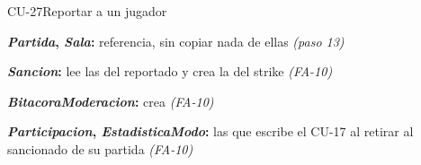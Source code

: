 \begin{fichacu}{CU-27}{Reportar a un jugador}
{\begin{cudatos}
      \item \textbf{\textit{Partida}, \textit{Sala}:} referencia, sin copiar nada de ellas \textit{(paso 13)}
      \item \textbf{\textit{Sancion}:} lee las del reportado y crea la del strike \textit{(\mbox{FA-10})}
      \item \textbf{\textit{BitacoraModeracion}:} crea \textit{(\mbox{FA-10})}
      \item \textbf{\textit{Participacion}, \textit{EstadisticaModo}:} las que escribe el \mbox{CU-17} al retirar al sancionado de su partida \textit{(\mbox{FA-10})}
    \end{cudatos}} \\ \hline
\end{fichacu}
\clearpage
